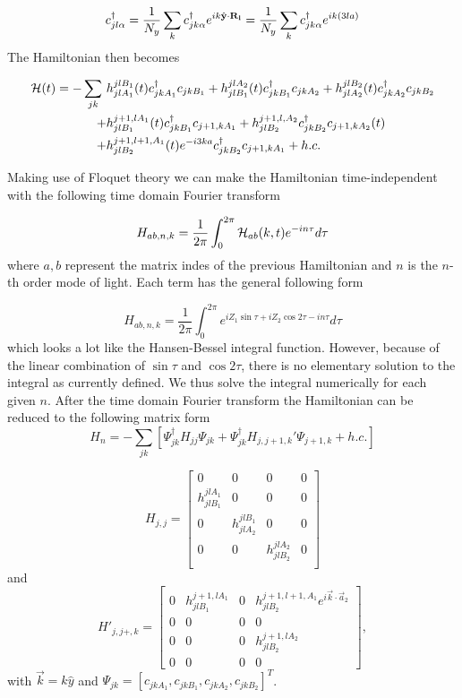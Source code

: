 \begin{equation}
  \cc_{jl\alpha} = \dfrac{1}{N_y} \sum_k \cc_{jk\alpha} e^{ik\hat{y}\cdot\vec{R_l}} = \dfrac{1}{N_y} \sum_k \cc_{jk\alpha} e^{ik(3la)}
\end{equation}
The Hamiltonian then becomes

\begin{equation}
\begin{split}
  \mathcal{H} (t) = -\sum_{jk} \ &h_{jlA_1}^{jlB_1}(t) c^{\dagger}_{jkA_1} c_{jkB_1} + h_{jlB_1}^{jlA_2}(t) c^{\dagger}_{jkB_1} c_{jkA_2} + h_{jlA_2}^{jlB_2}(t) c^{\dagger}_{jkA_2} c_{jkB_2} \\
      + &h_{jlB_1}^{j+1,lA_1}(t) c^{\dagger}_{jkB_1} c_{j+1,kA_1} + h_{jlB_2}^{j+1,l,A_2} c^{\dagger}_{jkB_2} c_{j+1,kA_2}(t) \\
      + &h_{jlB_2}^{j+1,l+1,A_1}(t) e^{-i3ka} c^{\dagger}_{jkB_2} c_{j+1,kA_1} + h.c.
\end{split}
\end{equation}

Making use of Floquet theory we can make the Hamiltonian time-independent with the following time domain Fourier transform

\begin{equation}
  H_{ab,n,k} = \dfrac{1}{2\pi} \int_0^{2\pi} \mathcal{H}_{ab}(k,t) e^{-in\tau} d\tau
\end{equation}
where $a,b$ represent the matrix indes of the previous Hamiltonian and $n$ is the $n$-th order mode of light.
Each term has the general following form

\begin{equation}
  H_{ab,n,k} = \dfrac{1}{2\pi} \int_0^{2\pi} e^{i Z_1 \sin\tau + i Z_2 \cos2\tau - in\tau} d\tau
\end{equation}
which looks a lot like the Hansen-Bessel integral function.
However, because of the linear combination of $\sin\tau$ and $\cos 2\tau$, there is no elementary solution to the integral as currently defined.
We thus solve the integral numerically for each given $n$.
After the time domain Fourier transform the Hamiltonian can be reduced to the following matrix form
\begin{equation}
  H_n = -\sum_{jk} \left[ \Psi_{jk}^{\dagger} H_{jj} \Psi_{jk} + \Psi_{jk}^{\dagger} H_{j,j+1,k}' \Psi_{j+1,k} + h.c. \right]
\end{equation}

\[
  H_{j,j} =
  \begin{bmatrix}
    0 & 0 & 0 & 0 \\
    h^{jlA_1}_{jlB_1} & 0 & 0 & 0 \\
    0 & h^{jlB_1}_{jlA_2} & 0 & 0 \\
    0 & 0 & h^{jlA_2}_{jlB_2} & 0 \\
  \end{bmatrix}
\]
and
\[
  H'_{j,j+,k} =
  \begin{bmatrix}
    0 & h^{j+1,lA_1}_{jlB_1} & 0 & h^{j+1,l+1,A_1}_{jlB_2} e^{i\vec{k}\cdot\vec{a}_2} \\
    0 & 0 & 0 & 0 \\
    0 & 0 & 0 & h^{j+1,lA_2}_{jlB_2} \\
    0 & 0 & 0 & 0
  \end{bmatrix},
\]
with $\vec{k} = k\hat{y}$ and $\Psi_{jk} = [c_{jkA_1}, c_{jkB_1}, c_{jkA_2}, c_{jkB_2}]^T$.


